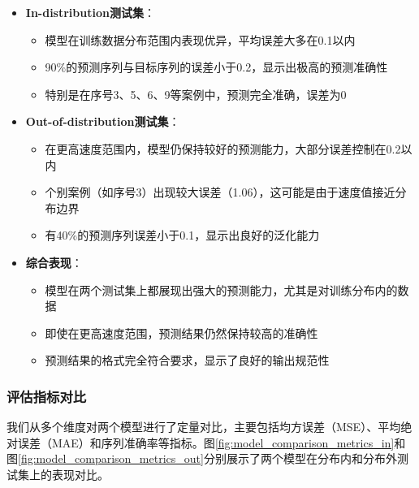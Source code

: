 \documentclass[a4paper, 12pt]{article}
\begin{document}
\begin{itemize}
    \item \textbf{In-distribution测试集}：
        \begin{itemize}
            \item 模型在训练数据分布范围内表现优异，平均误差大多在0.1以内
            \item 90\%的预测序列与目标序列的误差小于0.2，显示出极高的预测准确性
            \item 特别是在序号3、5、6、9等案例中，预测完全准确，误差为0
        \end{itemize}
    
    \item \textbf{Out-of-distribution测试集}：
        \begin{itemize}
            \item 在更高速度范围内，模型仍保持较好的预测能力，大部分误差控制在0.2以内
            \item 个别案例（如序号3）出现较大误差（1.06），这可能是由于速度值接近分布边界
            \item 有40\%的预测序列误差小于0.1，显示出良好的泛化能力
        \end{itemize}
    
    \item \textbf{综合表现}：
        \begin{itemize}
            \item 模型在两个测试集上都展现出强大的预测能力，尤其是对训练分布内的数据
            \item 即使在更高速度范围，预测结果仍然保持较高的准确性
            \item 预测结果的格式完全符合要求，显示了良好的输出规范性
        \end{itemize}
\end{itemize}

\subsubsection{评估指标对比}
我们从多个维度对两个模型进行了定量对比，主要包括均方误差（MSE）、平均绝对误差（MAE）和序列准确率等指标。图\ref{fig:model_comparison_metrics_in}和图\ref{fig:model_comparison_metrics_out}分别展示了两个模型在分布内和分布外测试集上的表现对比。
\end{document}
